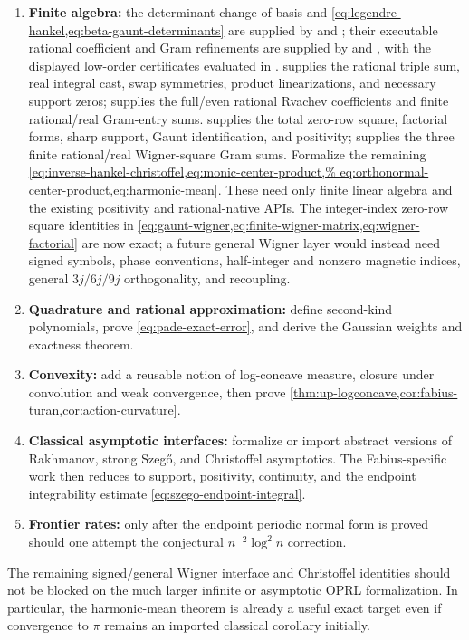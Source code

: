 \documentclass[11pt,oneside]{article}
\theoremstyle{definition}
\theoremstyle{remark}
\numberwithin{equation}{section}
\begin{document}
\begin{enumerate}
\item \textbf{Finite algebra:} the determinant change-of-basis and
      \cref{eq:legendre-hankel,eq:beta-gaunt-determinants} are supplied by
       and
      ; their executable rational
      coefficient and Gram refinements are supplied by
       and
      , with the displayed low-order
      certificates evaluated in .
       supplies the rational triple sum, real integral cast,
      swap symmetries, product linearizations, and necessary support zeros;
       supplies the full/even rational Rvachev
      coefficients and finite rational/real Gram-entry sums.
       supplies the total zero-row square,
      factorial forms, sharp support, Gaunt identification, and positivity;
       supplies the three finite
      rational/real Wigner-square Gram sums.
      Formalize the remaining
      \cref{eq:inverse-hankel-christoffel,eq:monic-center-product,%
eq:orthonormal-center-product,eq:harmonic-mean}.  These need only finite
      linear algebra and the existing positivity and rational-native APIs.  The
      integer-index zero-row square identities in
      \cref{eq:gaunt-wigner,eq:finite-wigner-matrix,eq:wigner-factorial} are now
      exact; a future general Wigner layer would instead need signed symbols,
      phase conventions, half-integer and nonzero magnetic indices, general
      \(3j/6j/9j\) orthogonality, and recoupling.
\item \textbf{Quadrature and rational approximation:} define second-kind
      polynomials, prove \cref{eq:pade-exact-error}, and derive the Gaussian
      weights and exactness theorem.
\item \textbf{Convexity:} add a reusable notion of log-concave measure,
      closure under convolution and weak convergence, then prove
      \cref{thm:up-logconcave,cor:fabius-turan,cor:action-curvature}.
\item \textbf{Classical asymptotic interfaces:} formalize or import abstract
      versions of Rakhmanov, strong Szeg\H{o}, and Christoffel asymptotics.
      The Fabius-specific work then reduces to support, positivity, continuity,
      and the endpoint integrability estimate
      \cref{eq:szego-endpoint-integral}.
\item \textbf{Frontier rates:} only after the endpoint periodic normal form is
      proved should one attempt the conjectural $n^{-2}\log^2n$ correction.
\end{enumerate}
The remaining signed/general Wigner interface and Christoffel identities should not
be blocked on the much larger infinite or asymptotic OPRL formalization.  In
particular, the harmonic-mean theorem is already a useful exact target even if
convergence to $\pi$ remains an imported classical corollary initially.
\end{document}
